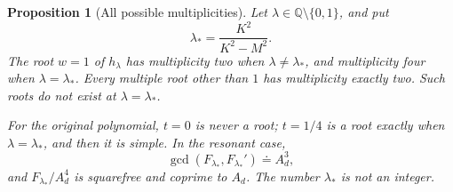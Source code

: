 \documentclass[11pt,a4paper]{article}
\newtheorem{proposition}[theorem]{Proposition}
\theoremstyle{definition}
\theoremstyle{remark}
\begin{document}
\begin{proposition}[All possible multiplicities]\label{iw:multiplicities}
Let \(\lambda\in\mathbb Q\setminus\{0,1\}\), and put
\begin{equation}\label{iw:resonance}
 \lambda_*=\frac{K^2}{K^2-M^2}.
\end{equation}
The root \(w=1\) of \(h_\lambda\) has multiplicity two when
\(\lambda\ne\lambda_*\), and multiplicity four when
\(\lambda=\lambda_*\). Every multiple root other than \(1\)
has multiplicity exactly two. Such roots do not exist at
\(\lambda=\lambda_*\).

For the original polynomial, \(t=0\) is never a root;
\(t=1/4\) is a root exactly when \(\lambda=\lambda_*\), and then
it is simple. In the resonant case,
\begin{equation}\label{iw:resonant-gcd}
 \gcd(F_{\lambda_*},F_{\lambda_*}')\doteq A_d^3,
\end{equation}
and \(F_{\lambda_*}/A_d^4\) is squarefree and coprime to \(A_d\).
The number \(\lambda_*\) is not an integer.
\end{proposition}
\end{document}
